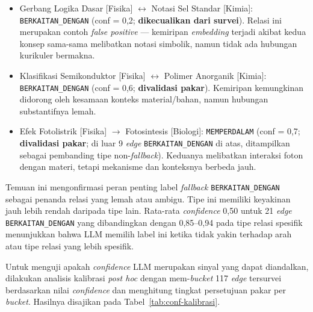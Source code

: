 \documentclass[../../thesis]{subfiles}
\begin{document}
\begin{itemize}
  \item Gerbang Logika Dasar [Fisika] $\leftrightarrow$ Notasi Sel Standar [Kimia]:
    \texttt{BERKAITAN\_DENGAN} (conf = 0{,}2; \textbf{dikecualikan dari survei}).
    Relasi ini merupakan contoh \textit{false positive} --- kemiripan
    \textit{embedding} terjadi akibat kedua konsep sama-sama melibatkan
    notasi simbolik, namun tidak ada hubungan kurikuler bermakna.
  \item Klasifikasi Semikonduktor [Fisika] $\leftrightarrow$ Polimer Anorganik [Kimia]:
    \texttt{BERKAITAN\_DENGAN} (conf = 0{,}6; \textbf{divalidasi pakar}).
    Kemiripan kemungkinan didorong oleh kesamaan konteks material/bahan,
    namun hubungan substantifnya lemah.
  \item Efek Fotolistrik [Fisika] $\to$ Fotosintesis [Biologi]:
    \texttt{MEMPERDALAM} (conf = 0{,}7; \textbf{divalidasi pakar}; di luar 9
    \textit{edge} \texttt{BERKAITAN\_DENGAN} di atas, ditampilkan sebagai
    pembanding tipe non-\textit{fallback}). Keduanya melibatkan interaksi
    foton dengan materi, tetapi mekanisme dan konteksnya berbeda jauh.
\end{itemize}

Temuan ini mengonfirmasi peran penting label \textit{fallback} \texttt{BERKAITAN\_DENGAN}
sebagai penanda relasi yang lemah atau ambigu. Tipe ini memiliki keyakinan jauh
lebih rendah daripada tipe lain. Rata-rata \textit{confidence} 0{,}50 untuk 21
\textit{edge} \texttt{BERKAITAN\_DENGAN} yang dibandingkan dengan 0{,}85--0{,}94 pada tipe relasi
spesifik menunjukkan bahwa LLM memilih label ini ketika tidak yakin terhadap
arah atau tipe relasi yang lebih spesifik.

Untuk menguji apakah \textit{confidence} LLM merupakan sinyal yang
dapat diandalkan, dilakukan analisis kalibrasi \textit{post hoc}
dengan mem-\textit{bucket} 117 \textit{edge} tersurvei berdasarkan
nilai \textit{confidence} dan menghitung tingkat persetujuan pakar
per \textit{bucket}. Hasilnya disajikan pada
Tabel~\ref{tab:conf-kalibrasi}.
\end{document}
